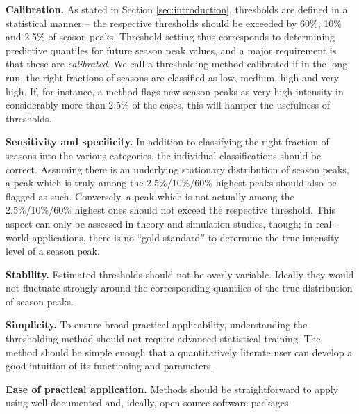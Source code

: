\documentclass[12pt]{article}
\begin{document}
\begin{description}
\item \textbf{Calibration.} As stated in Section \ref{sec:introduction}, thresholds are defined in a statistical manner -- the respective thresholds should be exceeded by 60\%, 10\% and 2.5\% of season peaks. Threshold setting thus corresponds to determining predictive quantiles for future season peak values, and a major requirement is that these are \textit{calibrated}. We call a thresholding method calibrated if in the long run, the right fractions of seasons are classified as low, medium, high and very high. If, for instance, a method flags new season peaks as very high intensity in considerably more than 2.5\% of the cases, this will hamper the usefulness of thresholds.
\item \textbf{Sensitivity and specificity.} In addition to classifying the right fraction of seasons into the various categories, the individual classifications should be correct. Assuming there is an underlying stationary distribution of season peaks, a peak which is truly among the 2.5\%/10\%/60\% highest peaks should also be flagged as such. Conversely, a peak which is not actually among the 2.5\%/10\%/60\% highest ones should not exceed the respective threshold. This aspect can only be assessed in theory and simulation studies, though; in real-world applications, there is no ``gold standard'' to determine the true intensity level of a season peak. %
\item \textbf{Stability.} Estimated thresholds should not be overly variable. Ideally they would not fluctuate strongly around the corresponding quantiles of the true distribution of season peaks.
\item \textbf{Simplicity.} To ensure broad practical applicability, understanding the thresholding method should not require advanced statistical training. The method should be simple enough that a quantitatively literate user can develop a good intuition of its functioning and parameters.
\item \textbf{Ease of practical application.} Methods should be straightforward to apply using well-documented and, ideally, open-source software packages.
\end{description}
\end{document}
